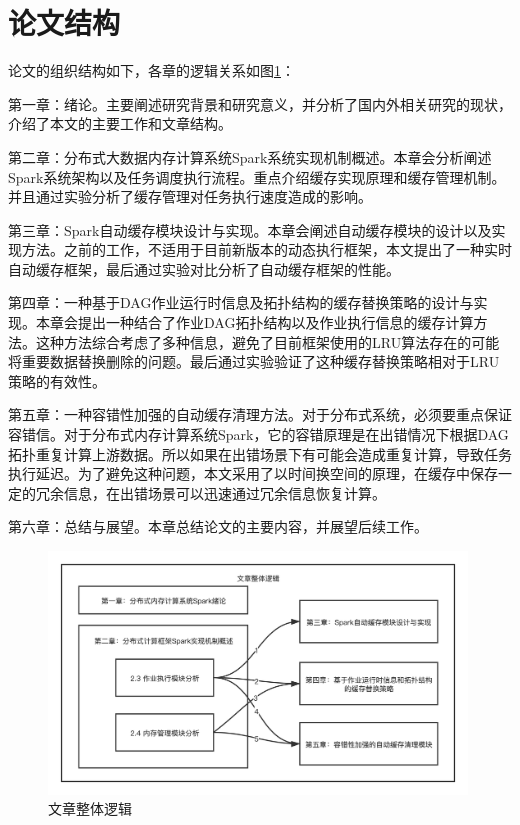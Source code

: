 \section{论文结构}

论文的组织结构如下，各章的逻辑关系如图\ref{fig:paper-logic}：

第一章：绪论。主要阐述研究背景和研究意义，并分析了国内外相关研究的现状，介绍了本文的主要工作和文章结构。

第二章：分布式大数据内存计算系统Spark系统实现机制概述。本章会分析阐述Spark系统架构以及任务调度执行流程。重点介绍缓存实现原理和缓存管理机制。并且通过实验分析了缓存管理对任务执行速度造成的影响。

第三章：Spark自动缓存模块设计与实现。本章会阐述自动缓存模块的设计以及实现方法。之前的工作，不适用于目前新版本的动态执行框架，本文提出了一种实时自动缓存框架，最后通过实验对比分析了自动缓存框架的性能。

第四章：一种基于DAG作业运行时信息及拓扑结构的缓存替换策略的设计与实现。本章会提出一种结合了作业DAG拓扑结构以及作业执行信息的缓存计算方法。这种方法综合考虑了多种信息，避免了目前框架使用的LRU算法存在的可能将重要数据替换删除的问题。最后通过实验验证了这种缓存替换策略相对于LRU策略的有效性。

第五章：一种容错性加强的自动缓存清理方法。对于分布式系统，必须要重点保证容错信。对于分布式内存计算系统Spark，它的容错原理是在出错情况下根据DAG拓扑重复计算上游数据。所以如果在出错场景下有可能会造成重复计算，导致任务执行延迟。为了避免这种问题，本文采用了以时间换空间的原理，在缓存中保存一定的冗余信息，在出错场景可以迅速通过冗余信息恢复计算。

第六章：总结与展望。本章总结论文的主要内容，并展望后续工作。

\begin{figure}
    \centering
    \includegraphics[width=0.99\textwidth]{Img/毕业设计整体逻辑.png}
    \caption{文章整体逻辑}
    \label{fig:paper-logic}
\end{figure}

